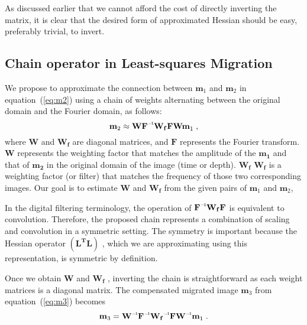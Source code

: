 As discussed earlier that we cannot afford the cost of directly inverting the matrix, it is clear that the desired form of approximated Hessian should be easy, preferably trivial, to invert.


\subsection*{Chain operator in Least-squares Migration}

We propose to approximate the connection between $\mathbf{m}_1$ and $\mathbf{m}_2$ in equation~(\ref{eq:m2}) using a chain of weights alternating between the original domain and the Fourier domain, as follows:
\begin{equation}
    \label{eq:wfw}
    \mathbf{m}_2 \approx \mathbf{W\inv{F}W_{f}FW m}_1\;,
\end{equation}
where $\mathbf{W}$ and $\mathbf{W_f}$ are diagonal matrices, and $\mathbf{F}$ represents the Fourier transform. $\mathbf{W}$ represents the weighting factor that matches the amplitude of the $\mathbf{m_1}$ and that of $\mathbf{m_2}$ in the original domain of the image (time or depth). $\mathbf{W_f}$ $\mathbf{W_f}$ is a weighting factor (or filter) that matches the frequency of those two corresponding images. Our goal is to estimate $\mathbf{W}$ and $\mathbf{W_f}$ from the given pairs of $\mathbf{m}_1$ and $\mathbf{m}_2$,

 In the digital filtering terminology, the operation of $\mathbf{\inv{F}W_{f}F}$ is equivalent to convolution. Therefore, the proposed chain represents a combination of scaling and convolution in a symmetric setting. The symmetry is important because the Hessian operator $\mathbf{(L^T L)}$ , which we are approximating using this representation, is symmetric by definition. 
 
 Once we obtain $\mathbf{W} $ and $ \mathbf{W_f }$ , inverting the chain is straightforward as each weight matrices is a diagonal matrix. The compensated migrated image $\mathbf{m}_3$ from equation~(\ref{eq:m3}) becomes
\begin{equation}
 \mathbf{
m}_{3} = 
\mathbf{\inv{W}\inv{F}\inv{W_f}F\inv{W} m}_1\;.
\label{lsmig}
\end{equation}
 



